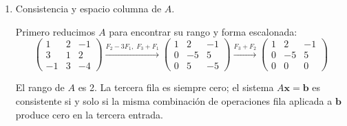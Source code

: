 \documentclass[12pt,letterpaper]{article}
\begin{document}
\begin{enumerate}
\begin{enumerate}
    \item \textbf{Variables pivote:} $x_1$, $x_2$, $x_4$. \quad \textbf{Variable libre:} $x_3 = t$.

    \item De la RREF: $x_1 = -\tfrac{1}{4}t$, $x_2 = \tfrac{7}{4}t$, $x_4 = 0$. Entonces:
    \[
    \mathbf{x} = t\begin{pmatrix} -\frac{1}{4} \\ \frac{7}{4} \\ 1 \\ 0 \end{pmatrix}
    = \frac{t}{4}\begin{pmatrix} -1 \\ 7 \\ 4 \\ 0 \end{pmatrix}
    \]
    Base del espacio nulo: $\mathcal{B}_{\text{nulo}} = \{(-1,7,4,0)\}$. \quad $\text{nulidad}(A) = 1$.

    \item $\text{rango}(A) = 3$. Verificación: $3 + 1 = 4 = n$ \checkmark

\end{enumerate}

\newpage
\item Consistencia y espacio columna de $A$.

Primero reducimos $A$ para encontrar su rango y forma escalonada:
\[
\begin{pmatrix} 1 & 2 & -1 \\ 3 & 1 & 2 \\ -1 & 3 & -4 \end{pmatrix}
\xrightarrow{F_2-3F_1,\;F_3+F_1}
\begin{pmatrix} 1 & 2 & -1 \\ 0 & -5 & 5 \\ 0 & 5 & -5 \end{pmatrix}
\xrightarrow{F_3+F_2}
\begin{pmatrix} 1 & 2 & -1 \\ 0 & -5 & 5 \\ 0 & 0 & 0 \end{pmatrix}
\]

El rango de $A$ es 2. La tercera fila es siempre cero; el sistema $A\mathbf{x}=\mathbf{b}$ es consistente si y solo si la misma combinación de operaciones fila aplicada a $\mathbf{b}$ produce cero en la tercera entrada.


\end{enumerate}
\end{document}
